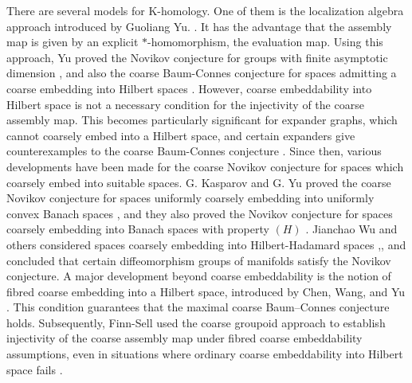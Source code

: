 \documentclass{article}
\theoremstyle{plain}
\theoremstyle{definition}
\theoremstyle{remark}
\begin{document}
	
	There are several models for K-homology. One of them is the localization algebra approach introduced by Guoliang Yu. \cite{yu1997localization}. It has the advantage that the assembly map is given by an explicit $*$-homomorphism, the evaluation map. Using this approach, Yu proved the Novikov conjecture for groups with finite asymptotic dimension \cite{yu1998novikov}, and also the coarse Baum-Connes conjecture for spaces admitting a coarse embedding into Hilbert spaces \cite{yu2000coarse}. However, coarse embeddability into Hilbert space is not a necessary condition for the injectivity of the coarse assembly map. This becomes particularly significant for expander graphs, which cannot coarsely embed into a Hilbert space, and certain expanders give counterexamples to the coarse Baum-Connes conjecture \cite{9b71e94cd22848fc8803555c49b2b1e9}. Since then, various developments have been made for the coarse Novikov conjecture for spaces which coarsely embed into suitable spaces. G. Kasparov and G. Yu proved the coarse Novikov conjecture for spaces uniformly coarsely embedding into uniformly convex Banach spaces \cite{KASPAROV20061}, and they also proved the Novikov conjecture for spaces coarsely embedding into Banach spaces with property $(H)$ \cite{kasparov2012novikov}. Jianchao Wu and others considered spaces coarsely embedding into Hilbert-Hadamard spaces \cite{gong2023novikov},\cite{gong2021novikov}, and concluded that certain diffeomorphism groups of manifolds satisfy the Novikov conjecture. A major development beyond coarse embeddability is the notion of fibred coarse embedding into a Hilbert space, introduced by Chen, Wang, and Yu \cite{CHEN201388}. This condition guarantees that the maximal coarse Baum–Connes conjecture holds. Subsequently, Finn-Sell used the coarse groupoid approach to establish injectivity of the coarse assembly map under fibred coarse embeddability assumptions, even in situations where ordinary coarse embeddability into Hilbert space fails \cite{FINNSELL20143758}. 
	
\end{document}
